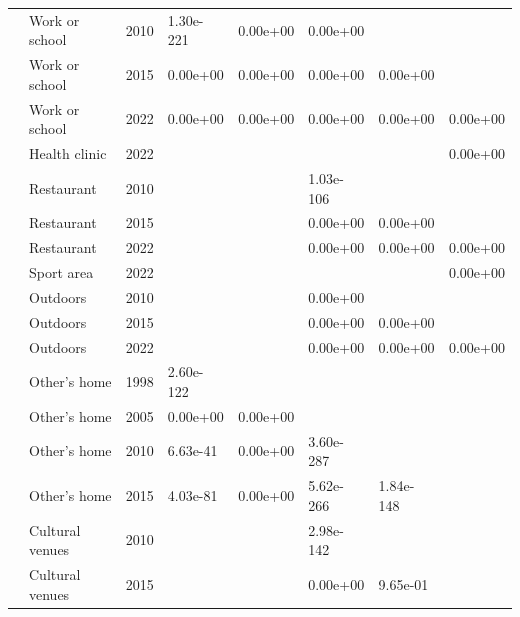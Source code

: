 \documentclass[preprint, 3p,
authoryear]{elsarticle} %
\begin{document}
\begin{longtable}[t]{llllllll}
\nopagebreak
 & Work or school & 2010 & 1.30e-221 & 0.00e+00 & 0.00e+00 &  & \\
\nopagebreak
 & Work or school & 2015 & 0.00e+00 & 0.00e+00 & 0.00e+00 & 0.00e+00 & \\
\nopagebreak
 & Work or school & 2022 & 0.00e+00 & 0.00e+00 & 0.00e+00 & 0.00e+00 & 0.00e+00\\
\nopagebreak
 & Health clinic & 2022 &  &  &  &  & 0.00e+00\\
\nopagebreak
 & Restaurant & 2010 &  &  & 1.03e-106 &  & \\
\nopagebreak
 & Restaurant & 2015 &  &  & 0.00e+00 & 0.00e+00 & \\
\nopagebreak
 & Restaurant & 2022 &  &  & 0.00e+00 & 0.00e+00 & 0.00e+00\\
\nopagebreak
 & Sport area & 2022 &  &  &  &  & 0.00e+00\\
\nopagebreak
 & Outdoors & 2010 &  &  & 0.00e+00 &  & \\
\nopagebreak
 & Outdoors & 2015 &  &  & 0.00e+00 & 0.00e+00 & \\
\nopagebreak
 & Outdoors & 2022 &  &  & 0.00e+00 & 0.00e+00 & 0.00e+00\\
\nopagebreak
 & Other's home & 1998 & 2.60e-122 &  &  &  & \\
\nopagebreak
 & Other's home & 2005 & 0.00e+00 & 0.00e+00 &  &  & \\
\nopagebreak
 & Other's home & 2010 & 6.63e-41 & 0.00e+00 & 3.60e-287 &  & \\
\nopagebreak
 & Other's home & 2015 & 4.03e-81 & 0.00e+00 & 5.62e-266 & 1.84e-148 & \\
\nopagebreak
 & Cultural venues & 2010 &  &  & 2.98e-142 &  & \\
\nopagebreak
\multirow[t]{-27}{*}{\raggedright\arraybackslash Cycling} & Cultural venues & 2015 &  &  & 0.00e+00 & 9.65e-01 & \\
\bottomrule
\end{longtable}
\endgroup{}

\renewcommand\refname{References}

\end{document}
